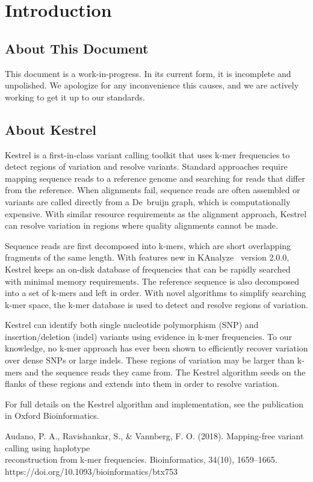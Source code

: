 
\section{Introduction}
\label{sec.intro}

\subsection{About This Document}
\label{sec.intro.aboutdoc}

This document is a work-in-progress. In its current form, it is incomplete and unpolished. We apologize for any inconvenience this causes, and we are actively working to get it up to our standards.


\subsection{About Kestrel}
\label{sec.intro.aboutkestrel}

Kestrel is a first-in-class variant calling toolkit that uses k-mer frequencies to detect regions of variation and resolve variants. Standard approaches require mapping sequence reads to a reference genome and searching for reads that differ from the reference. When alignments fail, sequence reads are often assembled or variants are called directly from a De~bruijn graph, which is computationally expensive. With similar resource requirements as the alignment approach, Kestrel can resolve variation in regions where quality alignments cannot be made.

Sequence reads are first decomposed into k-mers, which are short overlapping fragments of the same length. With features new in KAnalyze~\citep{Audano2014} version 2.0.0, Kestrel keeps an on-disk database of frequencies that can be rapidly searched with minimal memory requirements. The reference sequence is also decomposed into a set of k-mers and left in order. With novel algorithms to simplify searching k-mer space, the k-mer database is used to detect and resolve regions of variation.

Kestrel can identify both single nucleotide polymorphism (SNP) and insertion/deletion (indel) variants using evidence in k-mer frequencies. To our knowledge, no k-mer approach has ever been shown to efficiently recover variation over dense SNPs or large indels. These regions of variation may be larger than k-mers and the sequence reads they came from. The Kestrel algorithm seeds on the flanks of these regions and extends into them in order to resolve variation.

For full details on the Kestrel algorithm and implementation, see the publication in Oxford Bioinformatics.

Audano, P. A., Ravishankar, S., \& Vannberg, F. O. (2018). Mapping-free variant calling using haplotype\\
reconstruction from k-mer frequencies. Bioinformatics, 34(10), 1659–1665.\\
https://doi.org/10.1093/bioinformatics/btx753
